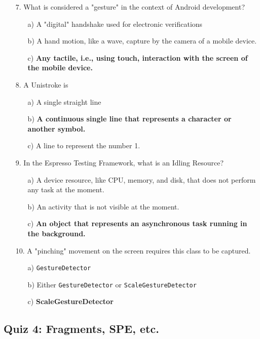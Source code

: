 \documentclass[12pt]{article}
\begin{document}
\begin{itemize}
    \item[7.] What is considered a "gesture" in the context of Android development?
    \begin{itemize}
        \item[a)] A "digital" handshake used for electronic verifications
        \item[b)] A hand motion, like a wave, capture by the camera of a mobile device.
        \item[c)] \textbf{Any tactile, i.e., using touch, interaction with the screen of the mobile device.}
    \end{itemize}

    \item[8.] A Unistroke is
    \begin{itemize}
        \item[a)] A single straight line
        \item[b)] \textbf{A continuous single line that represents a character or another symbol.}
        \item[c)] A line to represent the number 1.
    \end{itemize}

    \item[9.] In the Espresso Testing Framework, what is an Idling Resource?
    \begin{itemize}
        \item[a)] A device resource, like CPU, memory, and disk, that does not perform any task at the moment.
        \item[b)] An activity that is not visible at the moment.
        \item[c)] \textbf{An object that represents an asynchronous task running in the background.}
    \end{itemize}

    \item[10.] A "pinching" movement on the screen requires this class to be captured.
    \begin{itemize}
        \item[a)] \texttt{GestureDetector}
        \item[b)] Either \texttt{GestureDetector} or \texttt{ScaleGestureDetector}
        \item[c)] \textbf{ScaleGestureDetector}
    \end{itemize}

\end{itemize}

\subsection*{Quiz 4: Fragments, SPE, etc.}
\end{document}
